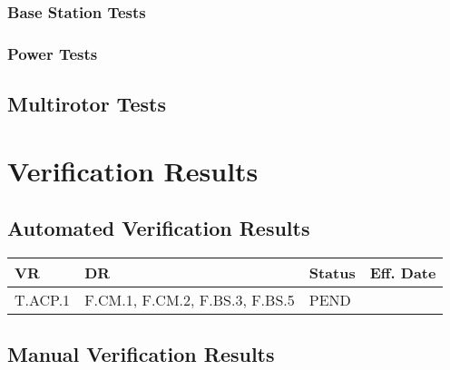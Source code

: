 \documentclass[10pt,letterpaper]{article}
\begin{document}
\subsubsection{Base Station Tests}


\subsubsection{Power Tests}


\subsection{Multirotor Tests}


\section{Verification Results} \label{results}

\subsection{Automated Verification Results}
\begin{table}[H]
	\centering
	\begin{tabular}{llll}
	\hline
	\textbf{VR} & \textbf{DR} & \textbf{Status} & \textbf{Eff. Date} \\
	\hline
	T.ACP.1 & F.CM.1, F.CM.2, F.BS.3, F.BS.5 & PEND   & \\
	\hline
	\end{tabular}
\end{table}

\subsection{Manual Verification Results}
\end{document}
